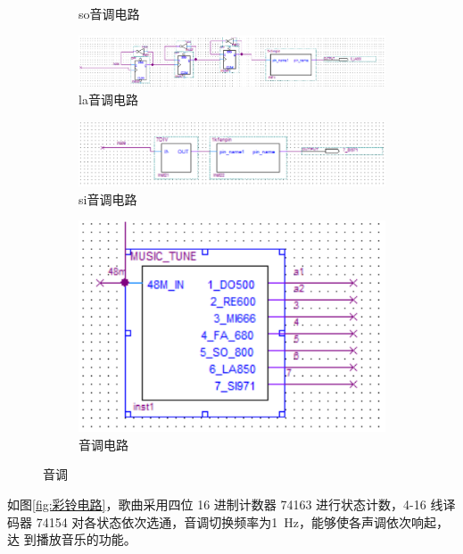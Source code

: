 \documentclass[twoside, openright]{article}
\begin{document}
\begin{figure}[htbp]
\begin{subfigure}[htbp]{.45\linewidth}
		\caption{so音调电路}
		\label{fig:so音调电路}
	\end{subfigure}
	\quad
	\begin{subfigure}[htbp]{.45\linewidth}
		\centering
		\includegraphics[width = \linewidth]{la.png}
		\caption{la音调电路}
		\label{fig:la音调电路}
	\end{subfigure}
	\quad
	\begin{subfigure}[htbp]{.45\linewidth}
		\centering
		\includegraphics[width = \linewidth]{si.png}
		\caption{si音调电路}
		\label{fig:si音调电路}
	\end{subfigure}
	\begin{subfigure}[htbp]{.45\linewidth}
		\centering
		\includegraphics[width = \linewidth]{tune.png}
		\caption{音调电路}
		\label{fig:音调电路}
	\end{subfigure}
	\caption{音调}
	\label{fig:音调}
\end{figure}

如图\ref{fig:彩铃电路}，歌曲采用四位 16 进制计数器 74163 进行状态计数，4-16 线译
码器 74154 对各状态依次选通，音调切换频率为\SI{1}{\Hz}，能够使各声调依次响起，达
到播放音乐的功能。
\end{document}
